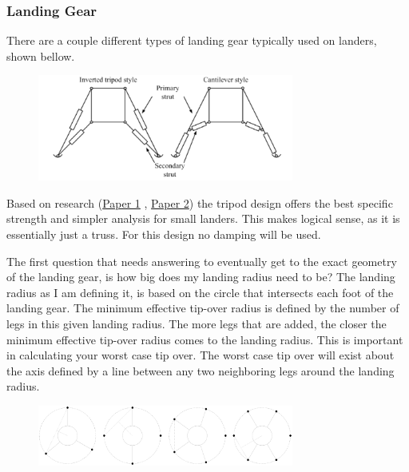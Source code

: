 \documentclass[12pt,letterpaper]{article}
\begin{document}
\subsubsection{Landing Gear}

There are a couple different types of landing gear typically used on landers, shown bellow.

\begin{figure}[h!]
\centering
\includegraphics[width = 0.75\textwidth]{Landing_Legs_Fig/types_of_landing_legs.png}
\end{figure}

Based on research (\href{https://books.google.com/books?id=Pe4lEAAAQBAJ&pg=PA379&lpg=PA379&dq=cantilever+vs+tripod+landing+gear+lander&source=bl&ots=DuGdF26dV6&sig=ACfU3U2t155w4LoJxWtv7OWv5jt4EfvQcA&hl=en&sa=X&ved=2ahUKEwib4qHcyIv6AhWbKkQIHW6DAAwQ6AF6BAggEAM#v=onepage&q=cantilever%20vs%20tripod%20landing%20gear%20lander&f=false}{Paper 1} , \href{https://ltu.diva-portal.org/smash/get/diva2:1159285/FULLTEXT01.pdf}{Paper 2}) the tripod design offers the best specific strength  and simpler analysis for small landers. This makes logical sense, as it is essentially just a truss. For this design no damping will be used.

The first question that needs answering to eventually get to the exact geometry of the landing gear, is how big does my landing radius need to be? The landing radius as I am defining it, is based on the circle that intersects each foot of the landing gear. The minimum effective tip-over radius is defined by the number of legs in this given landing radius. The more legs that are added, the closer the minimum effective tip-over radius comes to the landing radius. This is important in calculating your worst case tip over. The worst case tip over will exist about the axis defined by a line between any two neighboring legs around the landing radius. 

\begin{figure}[h!]
\centering
\includegraphics[width = 0.75\textwidth]{Landing_Legs_Fig/Landing_Radius.pdf}
\end{figure}
\end{document}
